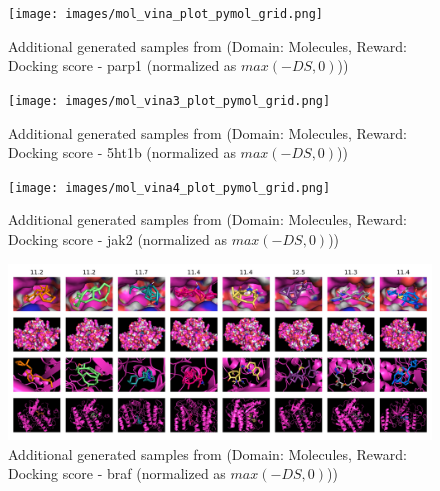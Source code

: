 \begin{figure}[!th]
    \centering
    \texttt{[image: images/mol\_vina\_plot\_pymol\_grid.png]}
    \caption{Additional generated samples from {\alg} (Domain: Molecules, Reward: Docking score - parp1 (normalized as $max(-DS, 0)$)) }
    \label{fig:vina1}
\end{figure}

\begin{figure}[!th]
    \centering
    \texttt{[image: images/mol\_vina3\_plot\_pymol\_grid.png]}
    \caption{Additional generated samples from {\alg} (Domain: Molecules, Reward: Docking score - 5ht1b (normalized as $max(-DS, 0)$))}
    \label{fig:vina3}
\end{figure}

\begin{figure}[!th]
    \centering
    \texttt{[image: images/mol\_vina4\_plot\_pymol\_grid.png]}
    \caption{Additional generated samples from {\alg} (Domain: Molecules, Reward: Docking score - jak2 (normalized as $max(-DS, 0)$))}
    \label{fig:vina4}
\end{figure}

\begin{figure}[!th]
    \centering
    \includegraphics[width=1.0\linewidth]{images/mol_vina5_plot_pymol_grid.jpg} %
    \caption{Additional generated samples from {\alg} (Domain: Molecules, Reward: Docking score - braf (normalized as $max(-DS, 0)$))}
    \label{fig:vina5}
\end{figure}